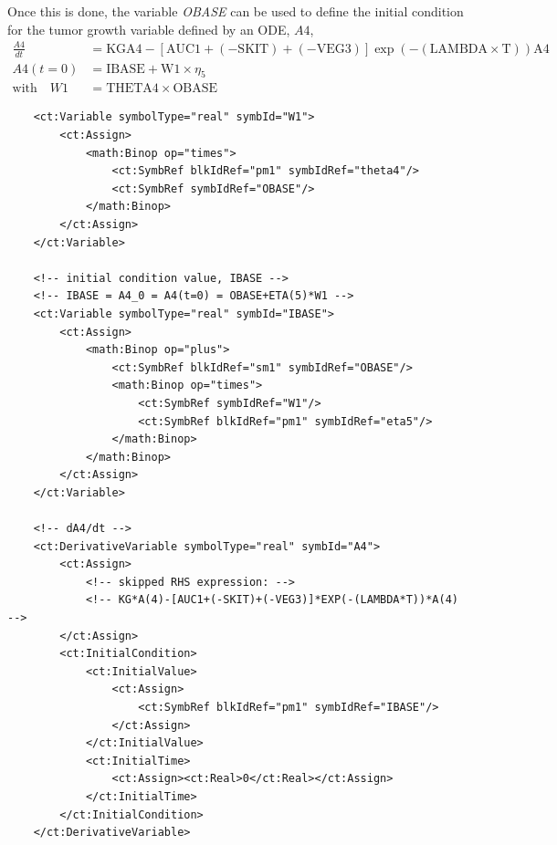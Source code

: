 Once this is done, the variable \emph{OBASE} can be used to define the 
initial condition for the tumor growth variable defined by an ODE, $A4$,
\begin{align}
\frac{A4}{dt} &= \mbox{KG} \mbox{A4}-[\mbox{AUC1}+(-\mbox{SKIT})+(-\mbox{VEG3})] \exp(-(\mbox{LAMBDA}\times \mbox{T}))\mbox{A4} \nonumber \\
A4(t=0)	& = \mbox{IBASE} + \mbox{W1}\times \eta_5 \nonumber \\
\mbox{with} \quad W1 & = \mbox{THETA4} \times \mbox{OBASE} \nonumber
\end{align}


\lstset{language=XML}
\begin{lstlisting}
    <ct:Variable symbolType="real" symbId="W1">
        <ct:Assign>
            <math:Binop op="times">
                <ct:SymbRef blkIdRef="pm1" symbIdRef="theta4"/>
                <ct:SymbRef symbIdRef="OBASE"/>
            </math:Binop>
        </ct:Assign>
    </ct:Variable>
    
    <!-- initial condition value, IBASE -->
    <!-- IBASE = A4_0 = A4(t=0) = OBASE+ETA(5)*W1 -->
    <ct:Variable symbolType="real" symbId="IBASE">
        <ct:Assign>
            <math:Binop op="plus">
                <ct:SymbRef blkIdRef="sm1" symbIdRef="OBASE"/>
                <math:Binop op="times">
                    <ct:SymbRef symbIdRef="W1"/>
                    <ct:SymbRef blkIdRef="pm1" symbIdRef="eta5"/>
                </math:Binop>
            </math:Binop>
        </ct:Assign>
    </ct:Variable>
    
    <!-- dA4/dt -->
    <ct:DerivativeVariable symbolType="real" symbId="A4">
        <ct:Assign>
            <!-- skipped RHS expression: -->
            <!-- KG*A(4)-[AUC1+(-SKIT)+(-VEG3)]*EXP(-(LAMBDA*T))*A(4) -->
        </ct:Assign>
        <ct:InitialCondition>
            <ct:InitialValue>
                <ct:Assign>
                    <ct:SymbRef blkIdRef="pm1" symbIdRef="IBASE"/>
                </ct:Assign>
            </ct:InitialValue>
            <ct:InitialTime>
                <ct:Assign><ct:Real>0</ct:Real></ct:Assign>
            </ct:InitialTime>
        </ct:InitialCondition>
    </ct:DerivativeVariable>
\end{lstlisting}


%


